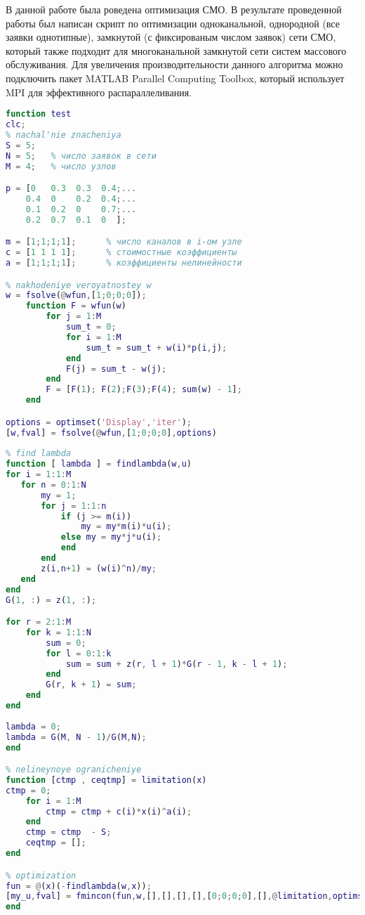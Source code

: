 \documentclass[14pt,a4paper,report]{report}
\begin{document}
В данной работе была роведена оптимизация СМО. В результате проведенной работы был написан скрипт по оптимизации одноканальной, однородной (все заявки однотипные), замкнутой (с фиксированым числом заявок) сети СМО, который также подходит для многоканальной замкнутой сети систем массового обслуживания. Для увеличения производительности данного алгоритма можно подключить пакет MATLAB Parallel Computing Toolbox, который использует MPI для эффективного распараллеливания.
\clearpage 
\begin{lstlisting}[language={matlab}, caption={Полный текст скрипта},  basicstyle=\ttfamily]
function test
clc;
% nachal'nie znacheniya
S = 5;
N = 5;   % число заявок в сети
M = 4;   % число узлов

p = [0   0.3  0.3  0.4;...
    0.4  0    0.2  0.4;...
    0.1  0.2  0    0.7;...
    0.2  0.7  0.1  0  ];

m = [1;1;1;1];      % число каналов в i-ом узле
c = [1 1 1 1];      % стоимостные коэффициенты
a = [1;1;1;1];      % коэффициенты нелинейности

% nakhodeniye veroyatnostey w
w = fsolve(@wfun,[1;0;0;0]);
    function F = wfun(w)
        for j = 1:M
            sum_t = 0;
            for i = 1:M
                sum_t = sum_t + w(i)*p(i,j);
            end
            F(j) = sum_t - w(j);
        end
        F = [F(1); F(2);F(3);F(4); sum(w) - 1];
    end

options = optimset('Display','iter');
[w,fval] = fsolve(@wfun,[1;0;0;0],options)
        
% find lambda
function [ lambda ] = findlambda(w,u)
for i = 1:1:M
   for n = 0:1:N
       my = 1;
       for j = 1:1:n
           if (j >= m(i))
               my = my*m(i)*u(i);
           else my = my*j*u(i);
           end
       end  
       z(i,n+1) = (w(i)^n)/my;
   end
end
G(1, :) = z(1, :);

for r = 2:1:M
    for k = 1:1:N
        sum = 0;
        for l = 0:1:k
            sum = sum + z(r, l + 1)*G(r - 1, k - l + 1);
        end
        G(r, k + 1) = sum;
    end
end
 
lambda = 0;
lambda = G(M, N - 1)/G(M,N);
end

% nelineynoye ogranicheniye
function [ctmp , ceqtmp] = limitation(x)
ctmp = 0;
    for i = 1:M
        ctmp = ctmp + c(i)*x(i)^a(i);
    end
    ctmp = ctmp  - S;
    ceqtmp = [];
end

% optimization
fun = @(x)(-findlambda(w,x));
[my_u,fval] = fmincon(fun,w,[],[],[],[],[0;0;0;0],[],@limitation,optimset('Display','iter'))
end
\end{lstlisting}
\end{document}
